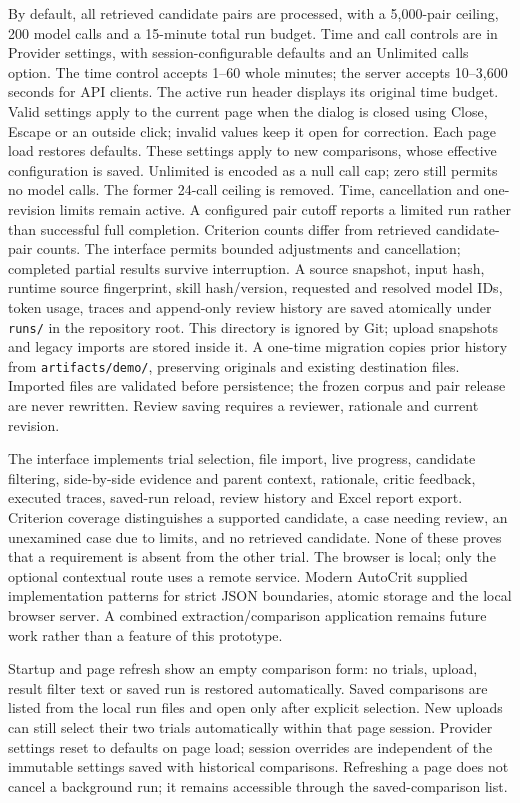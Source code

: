 \documentclass[10pt,letterpaper]{article}
\newcommand{\pathcode}[1]{\nolinkurl{#1}}
\begin{document}
By default, all retrieved candidate pairs are processed, with a 5,000-pair
ceiling, 200 model calls and a 15-minute total run budget. Time and call
controls are in Provider settings, with session-configurable defaults and
an Unlimited calls option. The time control accepts 1--60 whole minutes;
the server accepts 10--3,600 seconds for API clients. The active run header
displays its original time budget. Valid settings apply to the current page
when the dialog is closed using Close, Escape or an outside click; invalid
values keep it open for correction. Each page load restores defaults.
These settings apply to new comparisons, whose effective configuration is saved.
Unlimited is encoded as a null call cap; zero still permits no model calls.
The former 24-call ceiling is removed. Time, cancellation and one-revision
limits remain active. A configured pair cutoff reports a
limited run rather than successful full completion. Criterion counts differ
from retrieved candidate-pair counts. The interface permits bounded adjustments and cancellation; completed
partial results survive interruption. A source snapshot, input hash, runtime
source fingerprint, skill hash/version, requested and resolved model IDs,
token usage, traces and append-only review history are saved atomically under
\pathcode{runs/} in the repository root. This directory is ignored by Git;
upload snapshots and legacy imports are stored inside it. A one-time migration
copies prior history from \pathcode{artifacts/demo/}, preserving originals
and existing destination files. Imported files are
validated before persistence; the frozen corpus and pair release are never
rewritten. Review saving requires a reviewer, rationale and current revision.

The interface implements trial selection, file import, live progress, candidate
filtering, side-by-side evidence and parent context, rationale, critic feedback,
executed traces, saved-run reload, review history and Excel report export. Criterion
coverage distinguishes a supported candidate, a case needing review, an
unexamined case due to limits, and no retrieved candidate. None of these proves
that a requirement is absent from the other trial. The browser is local; only
the optional contextual route uses a remote service. Modern AutoCrit supplied
implementation patterns for strict JSON boundaries, atomic storage and the
local browser server. A combined extraction/comparison application remains
future work rather than a feature of this prototype.

Startup and page refresh show an empty comparison form: no trials, upload,
result filter text or saved run is restored automatically. Saved comparisons
are listed from the local run files and open only after explicit selection.
New uploads can still select their two trials automatically within that page
session. Provider settings reset to defaults on page load; session overrides
are independent of the immutable settings saved with historical comparisons.
Refreshing a page does not cancel a background run; it remains accessible through
the saved-comparison list.
\end{document}
